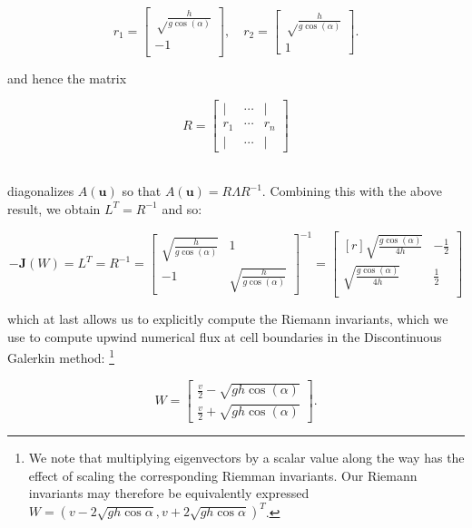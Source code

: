 $$
r_1 = \begin{bmatrix}
    \sqrt\frac{h}{g \cos{(\alpha)}} \\
    -1 \\
\end{bmatrix}, \quad r_2 = \begin{bmatrix}
    \sqrt\frac{h}{g \cos{(\alpha)}} \\
    1
\end{bmatrix}.
$$

\noindent and hence the matrix 

$$
R = \begin{bmatrix}
    \vert & \cdots & \vert \\
    r_1   & \cdots & r_n   \\
    \vert & \cdots & \vert
\end{bmatrix}
$$

\ \\
\noindent diagonalizes $A(\textbf{u})$ so that $A(\textbf{u}) = R \Lambda R^{-1}$. Combining this with the above result,
we obtain $L^T = R^{-1}$ and so:

\[\renewcommand\arraystretch{2}
-\textbf{J}(W) = L^T = R^{-1} = \begin{bmatrix}
    \sqrt{\frac{h}{g \cos{(\alpha)}}} & 1 \\
    -1                                & \sqrt{\frac{h}{g \cos{(\alpha)}}}
\end{bmatrix}^{-1} = \begin{bmatrix*}[r]
    \sqrt{\frac{g \cos{(\alpha)}}{4h}} & -\frac{1}{2} \\
    \sqrt{\frac{g \cos{(\alpha)}}{4h}} &  \frac{1}{2} \\
\end{bmatrix*}
\]

\noindent which at last allows us to explicitly compute the Riemann invariants, which we use to compute upwind 
numerical flux at cell boundaries in the Discontinuous Galerkin method: \footnote{
    We note that multiplying eigenvectors by a scalar value along the way has the effect of scaling the corresponding 
    Riemman invariants. Our Riemann invariants may therefore be equivalently expressed \linebreak
    $W = (v - 2 \sqrt{gh \cos{\alpha}}, v + 2 \sqrt{gh \cos{\alpha}})^T$.
}

\[\renewcommand\arraystretch{2}
W = \begin{bmatrix}
    \frac{v}{2} - \sqrt{g h \cos{(\alpha)}} \\ 
    \frac{v}{2} + \sqrt{g h \cos{(\alpha)}} 
\end{bmatrix}.
\]
